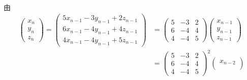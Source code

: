     \paragraph{} %
         由
         \begin{align*}
             \begin{pmatrix}
                 x_{n} \\
                 y_{n} \\
                 z_{n}
             \end{pmatrix} = \begin{pmatrix}
                                 5x_{n-1} - 3y_{n-1} + 2z_{n-1} \\
                                 6x_{n-1} - 4y_{n-1} + 4z_{n-1} \\
                                 4x_{n-1} - 4y_{n-1} + 5z_{n-1}
                             \end{pmatrix} & = \begin{pmatrix}
                                                   5 & -3 & 2 \\
                                                   6 & -4 & 4 \\
                                                   4 & -4 & 5
                                               \end{pmatrix}\begin{pmatrix}
                                                                x_{n-1} \\
                                                                y_{n-1} \\
                                                                z_{n-1}
                                                            \end{pmatrix}           \\
                                               & = \begin{pmatrix}
                                                       5 & -3 & 2 \\
                                                       6 & -4 & 4 \\
                                                       4 & -4 & 5
                                                   \end{pmatrix}^{2}\begin{pmatrix}
                                                                        x_{n-2} \\

\end{pmatrix}
\end{align*}
